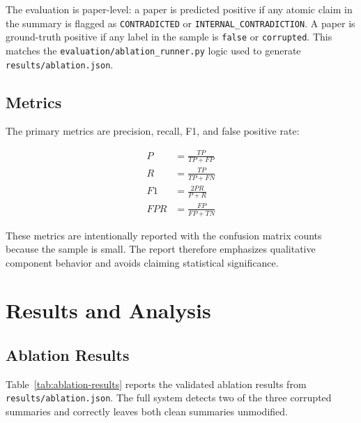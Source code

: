 \documentclass[12pt, a4paper]{report}
\begin{document}
The evaluation is paper-level: a paper is predicted positive if any atomic claim
in the summary is flagged as \texttt{CONTRADICTED} or
\texttt{INTERNAL\_CONTRADICTION}. A paper is ground-truth positive if any label
in the sample is \texttt{false} or \texttt{corrupted}. This matches the
\texttt{evaluation/ablation\_runner.py} logic used to generate
\texttt{results/ablation.json}.

\section{Metrics}

The primary metrics are precision, recall, F1, and false positive rate:

\begin{align}
P &= \frac{TP}{TP+FP} \\
R &= \frac{TP}{TP+FN} \\
F1 &= \frac{2PR}{P+R} \\
FPR &= \frac{FP}{FP+TN}
\end{align}

These metrics are intentionally reported with the confusion matrix counts
because the sample is small. The report therefore emphasizes qualitative
component behavior and avoids claiming statistical significance.



\chapter{Results and Analysis}

\section{Ablation Results}

Table~\ref{tab:ablation-results} reports the validated ablation results from
\texttt{results/ablation.json}. The full system detects two of the three
corrupted summaries and correctly leaves both clean summaries unmodified.
\end{document}

